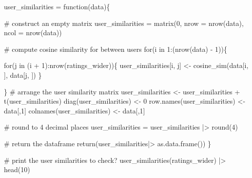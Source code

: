 \documentclass[
]{report}
\newenvironment{Shaded}{\begin{snugshade}}{\end{snugshade}}
\newcommand{\AttributeTok}[1]{\textcolor[rgb]{0.40,0.45,0.13}{#1}}
\newcommand{\CommentTok}[1]{\textcolor[rgb]{0.37,0.37,0.37}{#1}}
\newcommand{\ControlFlowTok}[1]{\textcolor[rgb]{0.00,0.23,0.31}{#1}}
\newcommand{\DecValTok}[1]{\textcolor[rgb]{0.68,0.00,0.00}{#1}}
\newcommand{\FunctionTok}[1]{\textcolor[rgb]{0.28,0.35,0.67}{#1}}
\newcommand{\NormalTok}[1]{\textcolor[rgb]{0.00,0.23,0.31}{#1}}
\newcommand{\OtherTok}[1]{\textcolor[rgb]{0.00,0.23,0.31}{#1}}
\newcommand{\SpecialCharTok}[1]{\textcolor[rgb]{0.37,0.37,0.37}{#1}}
\begin{document}
\begin{Shaded}
\begin{Highlighting}[]
\NormalTok{user\_similarities }\OtherTok{=} \ControlFlowTok{function}\NormalTok{(data)\{}
  
  
  
  \CommentTok{\# construct an empty matrix}
\NormalTok{  user\_similarities }\OtherTok{=} \FunctionTok{matrix}\NormalTok{(}\DecValTok{0}\NormalTok{, }\AttributeTok{nrow =} \FunctionTok{nrow}\NormalTok{(data), }\AttributeTok{ncol =} \FunctionTok{nrow}\NormalTok{(data))}
  
  \CommentTok{\# compute cosine similarity for between users}
  \ControlFlowTok{for}\NormalTok{(i }\ControlFlowTok{in} \DecValTok{1}\SpecialCharTok{:}\NormalTok{(}\FunctionTok{nrow}\NormalTok{(data) }\SpecialCharTok{{-}} \DecValTok{1}\NormalTok{))\{}
  
    \ControlFlowTok{for}\NormalTok{(j }\ControlFlowTok{in}\NormalTok{ (i }\SpecialCharTok{+} \DecValTok{1}\NormalTok{)}\SpecialCharTok{:}\FunctionTok{nrow}\NormalTok{(ratings\_wider))\{}
\NormalTok{    user\_similarities[i, j] }\OtherTok{\textless{}{-}} \FunctionTok{cosine\_sim}\NormalTok{(data[i, ], data[j, ])}
\NormalTok{    \}}
    
\NormalTok{  \}}
  \CommentTok{\# arrange the user similarity matrix }
\NormalTok{  user\_similarities            }\OtherTok{\textless{}{-}}\NormalTok{ user\_similarities }\SpecialCharTok{+} \FunctionTok{t}\NormalTok{(user\_similarities)}
  \FunctionTok{diag}\NormalTok{(user\_similarities)      }\OtherTok{\textless{}{-}} \DecValTok{0}
  \FunctionTok{row.names}\NormalTok{(user\_similarities) }\OtherTok{\textless{}{-}}\NormalTok{ data[,}\DecValTok{1}\NormalTok{]}
  \FunctionTok{colnames}\NormalTok{(user\_similarities)  }\OtherTok{\textless{}{-}}\NormalTok{ data[,}\DecValTok{1}\NormalTok{]}
  
  \CommentTok{\# round to 4 decimal places}
\NormalTok{  user\_similarities }\OtherTok{=}\NormalTok{ user\_similarities }\SpecialCharTok{|\textgreater{}} \FunctionTok{round}\NormalTok{(}\DecValTok{4}\NormalTok{)}
  
  \CommentTok{\# return the dataframe}
  \FunctionTok{return}\NormalTok{(user\_similarities}\SpecialCharTok{|\textgreater{}} \FunctionTok{as.data.frame}\NormalTok{())}
\NormalTok{\}}

\CommentTok{\# print the user similarities to check?}
\FunctionTok{user\_similarities}\NormalTok{(ratings\_wider) }\SpecialCharTok{|\textgreater{}} \FunctionTok{head}\NormalTok{(}\DecValTok{10}\NormalTok{)}
\end{Highlighting}
\end{Shaded}
\end{document}
